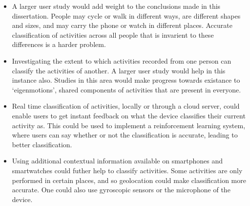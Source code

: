     \begin{itemize}
      \item A larger user study would add weight to the conclusions made in this dissertation. People may cycle or walk in different ways, are different shapes and sizes, and may carry the phone or watch in different places. Accurate classification of activities across all people that is invarient to these differences is a harder problem.
      \item Investigating the extent to which activities recorded from one person can classify the activities of another. A larger user study would help in this instance also. Studies in this area would make progress towards existance to `eigenmotions', shared components of activities that are present in everyone.
      \item Real time classification of activities, locally or through a cloud server, could enable users to get instant feedback on what the device classifies their current activity as. This could be used to implement a reinforcement learning system, where users can say whether or not the classification is accurate, leading to better classification.
      \item Using additional contextual information available on smartphones and smartwatches could futher help to classify activities. Some activities are only performed in certain places, and so geolocation could make classification more accurate. One could also use gyroscopic sensors or the microphone of the device.
    \end{itemize}
    